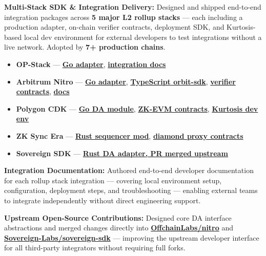 \documentclass[letterpaper,11pt]{article}
\newcommand{\resumeItem}[1]{
  \item\small{{#1 \vspace{-2pt}}}
}
\begin{document}
    \resumeItem{\textbf{Multi-Stack SDK \& Integration Delivery:} Designed and shipped end-to-end integration packages across \textbf{5 major L2 rollup stacks} — each including a production adapter, on-chain verifier contracts, deployment SDK, and Kurtosis-based local dev environment for external developers to test integrations without a live network. Adopted by \textbf{7+ production chains}.}
    \begin{itemize}
      \item \textbf{OP-Stack} — \href{https://github.com/availproject/avail-op-stack-adapter}{\textbf{Go adapter}}, \href{https://docs.availproject.org/docs/build-with-avail/deploy-rollup-on-avail/Optimium/op-stack/op-stack}{\textbf{integration docs}}
      \item \textbf{Arbitrum Nitro} — \href{https://github.com/availproject/avail-nitro-adapter}{\textbf{Go adapter}}, \href{https://github.com/availproject/arbitrum-orbit-sdk}{\textbf{TypeScript orbit-sdk}}, \href{https://github.com/availproject/nitro-contracts}{\textbf{verifier contracts}}, \href{https://docs.availproject.org/docs/build-with-avail/deploy-rollup-on-avail/Optimium/arbitrum-nitro/nitro-stack}{\textbf{docs}}
      \item \textbf{Polygon CDK} — \href{https://github.com/availproject/cdk}{\textbf{Go DA module}}, \href{https://github.com/availproject/cdk-zkevm-contracts}{\textbf{ZK-EVM contracts}}, \href{https://github.com/availproject/kurtosis-cdk}{\textbf{Kurtosis dev env}}
      \item \textbf{ZK Sync Era} — \href{https://github.com/availproject/zksync-era}{\textbf{Rust sequencer mod}}, \href{https://github.com/availproject/era-contracts}{\textbf{diamond proxy contracts}}
      \item \textbf{Sovereign SDK} — \href{https://github.com/Sovereign-Labs/sovereign-sdk/pull/1709}{\textbf{Rust DA adapter, PR merged upstream}}
    \end{itemize}

    \resumeItem{\textbf{Integration Documentation:} Authored end-to-end developer documentation for each rollup stack integration — covering local environment setup, configuration, deployment steps, and troubleshooting — enabling external teams to integrate independently without direct engineering support.}

    \resumeItem{\textbf{Upstream Open-Source Contributions:} Designed core DA interface abstractions and merged changes directly into \href{https://github.com/OffchainLabs/nitro/pull/2666}{\textbf{OffchainLabs/nitro}} and \href{https://github.com/Sovereign-Labs/sovereign-sdk/pull/1709}{\textbf{Sovereign-Labs/sovereign-sdk}} — improving the upstream developer interface for all third-party integrators without requiring full forks.}
\end{document}
